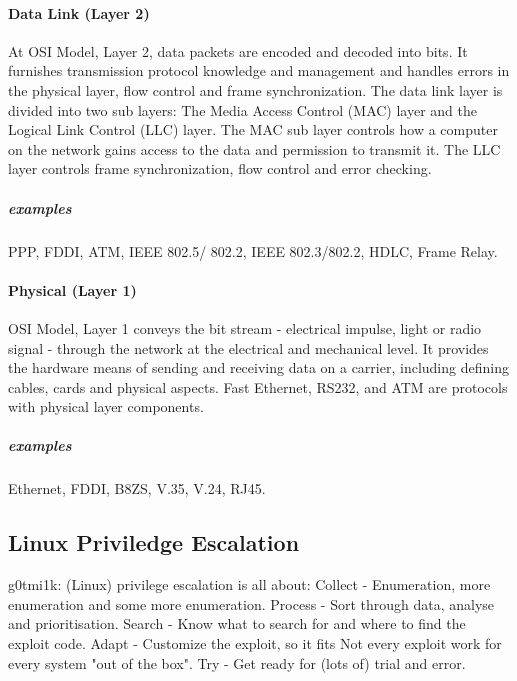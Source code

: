 \documentclass{article}[12pt]
\begin{document}
{\paragraph{Data Link (Layer 2)}
At OSI Model, Layer 2, data packets are encoded and decoded into bits.
It furnishes transmission protocol knowledge and management and handles errors in the physical layer, flow control and frame synchronization.
The data link layer is divided into two sub layers: The Media Access Control (MAC) layer and the Logical Link Control (LLC) layer.
The MAC sub layer controls how a computer on the network gains access to the data and permission to transmit it.
The LLC layer controls frame synchronization, flow control and error checking.
\subparagraph{examples} PPP, FDDI, ATM, IEEE 802.5/ 802.2, IEEE 802.3/802.2, HDLC, Frame Relay.


\paragraph{Physical (Layer 1)}
OSI Model, Layer 1 conveys the bit stream - electrical impulse, light or radio signal - through the network at the electrical and mechanical level.
It provides the hardware means of sending and receiving data on a carrier, including defining cables, cards and physical aspects.
Fast Ethernet, RS232, and ATM are protocols with physical layer components.
\subparagraph{examples} Ethernet, FDDI, B8ZS, V.35, V.24, RJ45.



\subsection{Linux Priviledge Escalation}

g0tmi1k: (Linux) privilege escalation is all about:
\newline
Collect - Enumeration, more enumeration and some more enumeration. \newline
Process - Sort through data, analyse and prioritisation. \newline
Search - Know what to search for and where to find the exploit code. \newline
Adapt - Customize the exploit, so it fits
Not every exploit work for every system "out of the box". \newline
Try - Get ready for (lots of) trial and error. \newline

}
\end{document}
